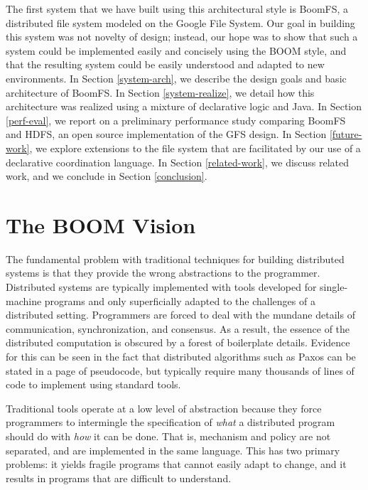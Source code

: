 \documentclass{article}
\begin{document}
The first system that we have built using this architectural style is
BoomFS, a distributed file system modeled on the Google File
System. Our goal in building this system was not novelty of design;
instead, our hope was to show that such a system could be implemented
easily and concisely using the BOOM style, and that the resulting
system could be easily understood and adapted to new environments.  In
Section \ref{system-arch}, we describe the design goals and basic
architecture of BoomFS. In Section \ref{system-realize}, we detail how
this architecture was realized using a mixture of declarative logic
and Java. In Section \ref{perf-eval}, we report on a preliminary
performance study comparing BoomFS and HDFS, an open source
implementation of the GFS design. In Section \ref{future-work}, we
explore extensions to the file system that are facilitated by our use
of a declarative coordination language. In Section \ref{related-work},
we discuss related work, and we conclude in Section \ref{conclusion}.

\section{The BOOM Vision}
\label{boom-vision}
The fundamental problem with traditional techniques for building
distributed systems is that they provide the wrong abstractions to the
programmer. Distributed systems are typically implemented with tools
developed for single-machine programs and only superficially adapted
to the challenges of a distributed setting. Programmers are forced to
deal with the mundane details of communication, synchronization, and
consensus. As a result, the essence of the distributed computation is
obscured by a forest of boilerplate details. Evidence for this can be
seen in the fact that distributed algorithms such as Paxos can be
stated in a page of pseudocode, but typically require many thousands
of lines of code to implement using standard
tools\cite{paxos-made-live}.

Traditional tools operate at a low level of abstraction because they
force programmers to intermingle the specification of \emph{what} a
distributed program should do with \emph{how} it can be done. That is,
mechanism and policy are not separated, and are implemented in the
same language. This has two primary problems: it yields fragile
programs that cannot easily adapt to change, and it results in
programs that are difficult to understand.
\end{document}
